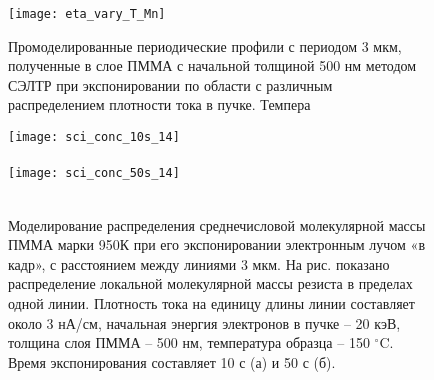 \documentclass[12pt, letterpaper]{article}
\begin{document}
\begin{figure}
	\begin{center}
		\texttt{[image: eta\_vary\_T\_Mn]}
	\end{center}
	
	\vspace{-2em}
	
	\caption{Промоделированные периодические профили с периодом 3 мкм, полученные в слое ПММА с начальной толщиной 500 нм методом СЭЛТР при экспонировании по области с различным распределением плотности тока в пучке. Темпера}
	\label{fig:DEBER_multibeam}
\end{figure}


\begin{figure}[t]
	\begin{center}
		\texttt{[image: sci\_conc\_10s\_14]} \\
		\vspace{-3.7em}  \vspace{2.7em} \\
		\texttt{[image: sci\_conc\_50s\_14]} \\
		\vspace{-3.7em}  \vspace{3.7em} \\
	\end{center}
	\vspace{-2.5em}
	\caption{Моделирование распределения среднечисловой молекулярной массы ПММА марки 950К при его экспонировании электронным лучом «в кадр», с расстоянием между линиями 3 мкм. На рис. показано распределение локальной молекулярной массы резиста в пределах одной линии. Плотность тока на единицу длины линии составляет около 3 нА/см, начальная энергия электронов в пучке – 20 кэВ, толщина слоя ПММА -- 500 нм, температура образца -- 150 $^\circ$C. Время экспонирования составляет 10 с (а) и 50 с (б).}
	\label{fig:Mn_hist}
\end{figure}
\end{document}

